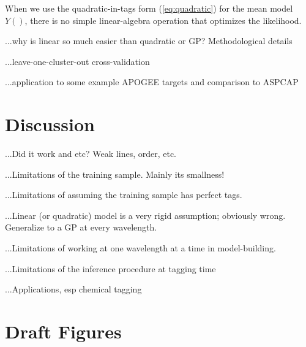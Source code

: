 \documentclass[12pt, preprint]{aastex}
\begin{document}
When we use the quadratic-in-tags form (\ref{eq:quadratic}) for the
mean model $Y()$, there is no simple linear-algebra operation that
optimizes the likelihood.



...why is linear so much easier than quadratic or GP?  Methodological details

...leave-one-cluster-out cross-validation

...application to some example APOGEE targets and comparison to ASPCAP

\section{Discussion}

...Did it work and etc?  Weak lines, order, etc.

...Limitations of the training sample.  Mainly its smallness!

...Limitations of assuming the training sample has perfect tags.

...Linear (or quadratic) model is a very rigid assumption; obviously wrong.
Generalize to a GP at every wavelength.

...Limitations of working at one wavelength at a time in model-building.

...Limitations of the inference procedure at tagging time

...Applications, esp chemical tagging

\section{Draft Figures}
\end{document}
